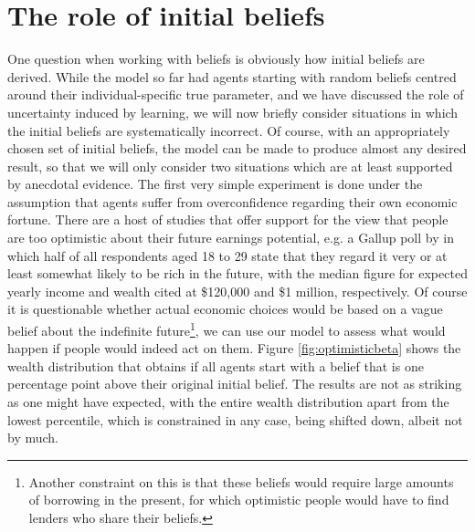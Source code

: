 \section{The role of initial beliefs}
One question when working with beliefs is obviously how initial beliefs are 
derived. While the model so far had agents starting with random beliefs centred
around their individual-specific true parameter, and we have discussed the role
of uncertainty induced by learning, we will now briefly consider situations in 
which the initial beliefs are systematically incorrect. Of course, with an 
appropriately chosen set of initial beliefs, the model can be made to produce 
almost any desired result, so that we will only consider two situations which 
are at least supported by anecdotal evidence. The first very simple experiment
is done under the assumption that agents suffer from overconfidence regarding
their own economic fortune. There are a host of studies that offer support for 
the view that people are too optimistic about their future earnings potential,
e.g. a Gallup poll by \citet{Moore2003} in which half of all respondents aged
18 to 29 state that they regard it very or at least somewhat likely to be rich
in the future, with the median figure for expected yearly income and wealth cited at
\$120,000 and \$1 million, respectively. Of course it is questionable whether 
actual economic choices would be based on a vague belief about the indefinite 
future\footnote{Another constraint on this is that these beliefs would require
large amounts of borrowing in the present, for which optimistic people would have
to find lenders who share their beliefs.}, we can use our model to assess what 
would happen if people would indeed act on them. Figure \ref{fig:optimisticbeta}
shows the wealth distribution that obtains if all agents start with a belief 
that is one percentage point above their original initial belief. The results
are not as striking as one might have expected, with the entire wealth distribution
apart from the lowest percentile, which is constrained in any case, being shifted
down, albeit not by much.

